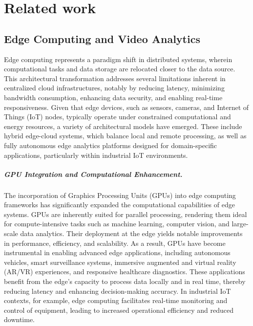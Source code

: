 \setchapterpreamble[u]{\margintoc}
\chapter{Related work}


\section{Edge Computing and Video Analytics}

Edge computing represents a paradigm shift in distributed systems, wherein computational tasks and data storage are relocated closer to the data source. This architectural transformation addresses several limitations inherent in centralized cloud infrastructures, notably by reducing latency, minimizing bandwidth consumption, enhancing data security, and enabling real-time responsiveness. Given that edge devices, such as sensors, cameras, and Internet of Things (IoT) nodes, typically operate under constrained computational and energy resources, a variety of architectural models have emerged. These include hybrid edge-cloud systems, which balance local and remote processing, as well as fully autonomous edge analytics platforms designed for domain-specific applications, particularly within industrial IoT environments.

\paragraph{GPU Integration and Computational Enhancement.}
The incorporation of Graphics Processing Units (GPUs) into edge computing frameworks has significantly expanded the computational capabilities of edge systems. GPUs are inherently suited for parallel processing, rendering them ideal for compute-intensive tasks such as machine learning, computer vision, and large-scale data analytics. Their deployment at the edge yields notable improvements in performance, efficiency, and scalability. As a result, GPUs have become instrumental in enabling advanced edge applications, including autonomous vehicles, smart surveillance systems, immersive augmented and virtual reality (AR/VR) experiences, and responsive healthcare diagnostics. These applications benefit from the edge's capacity to process data locally and in real time, thereby reducing latency and enhancing decision-making accuracy. In industrial IoT contexts, for example, edge computing facilitates real-time monitoring and control of equipment, leading to increased operational efficiency and reduced downtime.

